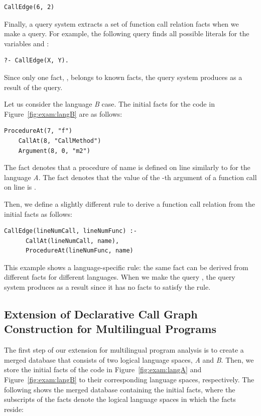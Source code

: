\begin{lstlisting}[style=mrule]
    CallEdge(6, 2)
\end{lstlisting}

Finally, a query system extracts a set of function call relation facts when we
make a query.  For example, the following query finds all possible literals for
the variables  and :

\begin{lstlisting}[style=mrule]
    ?- CallEdge(X, Y).
\end{lstlisting}
\noindent
Since only one  fact, , belongs to known
facts, the query system produces  as a result
of the query.

Let us consider the language {\it B} case.  The initial facts for the code in
Figure~\ref{fig:exam:langB} are as follows:

\begin{lstlisting}[style=mrule]
    ProcedureAt(7, "f")
    CallAt(8, "CallMethod")
    Argument(8, 0, "m2")
\end{lstlisting}

\noindent
The fact  denotes that a procedure of name
 is defined on line  similarly to
 for the language {\it A}.  The fact  denotes that the value of the -th argument
of a function call on line  is .

Then, we define a slightly different rule to derive a function call relation
from the initial facts as follows:

\begin{lstlisting}[style=mrule]
    CallEdge(lineNumCall, lineNumFunc) :-
      CallAt(lineNumCall, name),
      ProcedureAt(lineNumFunc, name)
\end{lstlisting}

\noindent
This example shows a language-specific rule: the same fact  can
be derived from different facts for different languages. When we make the query
, the query system produces  as a result since it has no facts to satisfy the rule.

\subsection{Extension of Declarative Call Graph Construction for Multilingual
Programs} The first step of our extension for multilingual program analysis is
to create a merged database that consists of two logical language spaces, {\it
A} and {\it B}. Then, we store the initial facts of the code in
Figure~\ref{fig:exam:langA} and Figure~\ref{fig:exam:langB} to their
corresponding language spaces, respectively. The following shows the merged
database containing the initial facts, where the subscripts of the facts denote
the logical language spaces in which the facts reside:


